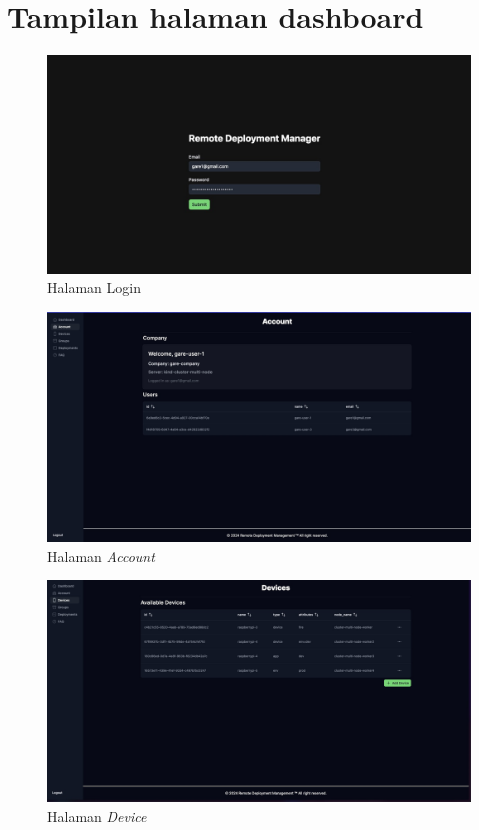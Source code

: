 \chapter{Tampilan halaman dashboard}
\label{appendix:tampilan-halaman-dashboard}

\begin{figure}[h]
  \centering
  \includegraphics[width=1\textwidth]{resources/chapter-4/dashboard/login-page.jpg}
  \caption{Halaman Login}
  \label{fig:halaman-login}
\end{figure}

\begin{figure}[h]
  \centering
  \includegraphics[width=1\textwidth]{resources/chapter-4/dashboard/account-page.jpg}
  \caption{Halaman \textit{Account}}
  \label{fig:halaman-account}
\end{figure}

\begin{figure}[h]
  \centering
  \includegraphics[width=1\textwidth]{resources/chapter-4/dashboard/device-page.jpg}
  \caption{Halaman \textit{Device}}
  \label{fig:halaman-device}
\end{figure}

